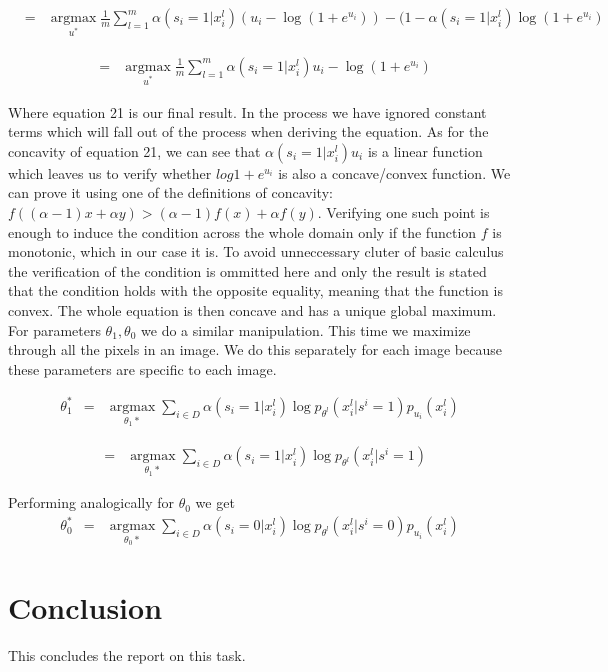 \documentclass[11pt]{article}
\DeclareMathOperator*{\argmax}{argmax}
\begin{document}
\begin{eqnarray}
 &=& \argmax\limits_{u^*} \frac{1}{m}\sum_{l=1}^m \alpha(s_i = 1 | x_i^l)(u_i - \log (1 + e^{u_i})) - (1 - \alpha(s_i = 1 | x_i^l) \log (1 + e^{u_i})
\end{eqnarray}

\begin{eqnarray}
 &=& \argmax\limits_{u^*} \frac{1}{m}\sum_{l=1}^m \alpha(s_i = 1 | x_i^l)u_i - \log (1 + e^{u_i})
\end{eqnarray}

Where equation 21 is our final result. In the process we have ignored constant terms which will fall out of the process when deriving the equation. As for the concavity of equation 21, we can see that 
$\alpha(s_i = 1 | x_i^l)u_i$ is a linear function which leaves us to verify whether $log{1 + e^{u_i}}$
is also a concave/convex function.  We can prove it using one of the definitions of concavity: $f((\alpha - 1)x + \alpha y) >  (\alpha - 1)f(x) + \alpha f(y) $. Verifying one such point is enough to induce the condition across the whole domain only if the function $f$ is monotonic, which in our case it is. To avoid unneccessary cluter of basic calculus the verification of the condition is ommitted here and only the result is stated that the condition holds with the opposite equality, meaning that the function is convex. The whole equation is then concave and has a unique global maximum. \\


For parameters $\theta_1,\theta_0$ we do a similar manipulation. This time we maximize through all the pixels in an image. We do this separately for each image because these parameters are specific to each image.

\begin{eqnarray}
\theta_1^* &=& \argmax\limits_{\theta_1*} \sum_{ i \in D} \alpha(s_i = 1 | x_i^l) \log p_{\theta^l}(x_i^l|s^i = 1) p_{u_i}(x_i^l) 
\end{eqnarray}

\begin{eqnarray}
&=& \argmax\limits_{\theta_1*} \sum_{ i \in D} \alpha(s_i = 1 | x_i^l) \log p_{\theta^l}(x_i^l|s^i = 1)
\end{eqnarray}

Performing analogically for $\theta_0$ we get
\begin{eqnarray}
\theta_0^* &=& \argmax\limits_{\theta_0*} \sum_{ i \in D} \alpha(s_i = 0 | x_i^l) \log p_{\theta^l}(x_i^l|s^i = 0) p_{u_i}(x_i^l) 
\end{eqnarray}

\section{Conclusion}
This concludes the report on this task.
\end{document}

